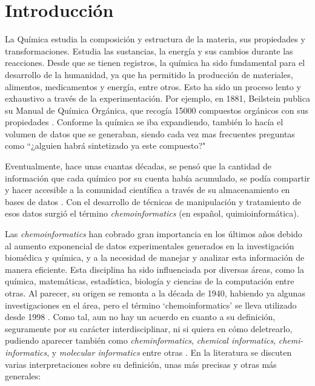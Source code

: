 \chapter{Introducción} \label{introduccion}


La Química estudia la composición y estructura de la materia, sus propiedades y transformaciones. Estudia las sustancias, la energía y sus cambios durante las reacciones. Desde que se tienen registros, la química ha sido fundamental para el desarrollo de la humanidad, ya que ha permitido la producción de materiales, alimentos, medicamentos y energía, entre otros. Esto ha sido un proceso lento y exhaustivo a través de la experimentación. Por ejemplo, en 1881, Beilstein publica su Manual de Química Orgánica, que recogía 15000 compuestos orgánicos con sus propiedades \cite{handbook_1881}. Conforme la química se iba expandiendo, también lo hacía el volumen de datos que se generaban, siendo cada vez mas frecuentes preguntas como ``¿alguien habrá sintetizado ya este compuesto?" \cite{applied_chemo_intro}

Eventualmente, hace unas cuantas décadas, se pensó que la cantidad de información que cada químico por su cuenta había acumulado, se podía compartir y hacer accesible a la comunidad científica a través de su almacenamiento en bases de datos \cite{chemo_a_textbook}. Con el desarrollo de técnicas de manipulación y tratamiento de esos datos surgió el término \emph{chemoinformatics} (en español, quimioinformática).

Las \emph{chemoinformatics} han cobrado gran importancia en los últimos años debido al aumento exponencial de datos experimentales generados en la investigación biomédica y química, y a la necesidad de manejar y analizar esta información de manera eficiente.
Esta disciplina ha sido influenciada por diversas áreas, como la química, matemáticas, estadística, biología y ciencias de la computación entre otras. Al parecer, su origen se remonta a la década de 1940, habiendo ya algunas investigaciones en el área, pero el término `chemoinformatics' se lleva utilizado desde 1998 \cite{leach_introduction_2007}. Como tal, aun no hay un acuerdo en cuanto a su definición, seguramente por su carácter interdisciplinar, ni si quiera en cómo deletrearlo, pudiendo aparecer también como \emph{cheminformatics}, \emph{chemical informatics}, \emph{chemi-informatics}, y \emph{molecular informatics} entre otras \cite{leach_introduction_2007, brown_chemoinformaticsintroduction_2009}. En la literatura se discuten varias interpretaciones sobre su definición, unas más precisas y otras más generales: \cite{leach_introduction_2007, basic_overview_chemo, brown_chemoinformaticsintroduction_2009, chemo_a_textbook}


